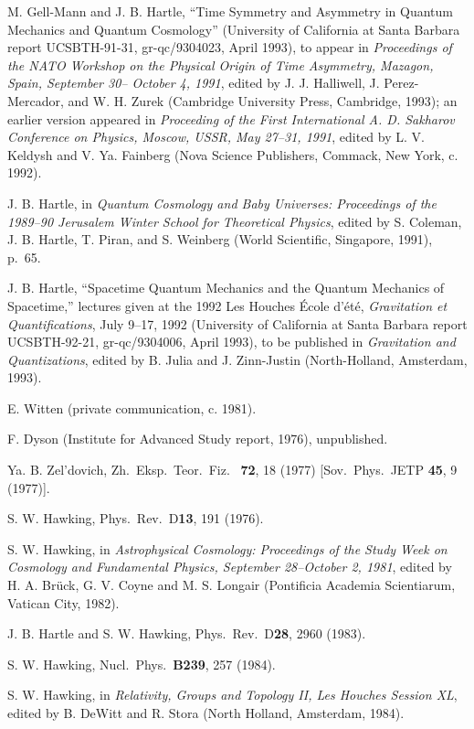 \documentclass[12pt]{article}
\begin{document}
\begin{thebibliography}{999}
 M. Gell-Mann and J. B. Hartle, ``Time Symmetry
and Asymmetry in Quantum Mechanics and Quantum
Cosmology'' (University of California at Santa Barbara
report UCSBTH-91-31, gr-qc/9304023, April 1993),
to appear in {\em
Proceedings of the NATO Workshop on the Physical Origin
of Time Asymmetry, Mazagon, Spain, September 30--
October 4, 1991}, edited by J. J. Halliwell, J. Perez-
Mercador, and W. H. Zurek (Cambridge University Press,
Cambridge, 1993); an earlier version appeared in
{\em Proceeding of the First
International A. D. Sakharov Conference on Physics,
Moscow, USSR, May 27--31, 1991}, edited by L. V. Keldysh
and V. Ya. Fainberg (Nova Science Publishers, Commack,
New York, c. 1992).

 J. B. Hartle, in {\em Quantum Cosmology and
Baby Universes:  Proceedings of the 1989--90 Jerusalem
Winter School for Theoretical Physics}, edited by S.
Coleman, J. B. Hartle, T. Piran, and S. Weinberg (World
Scientific, Singapore, 1991), p.~65.

 J. B. Hartle, ``Spacetime Quantum Mechanics
and the Quantum Mechanics of Spacetime,'' lectures given
at the 1992 Les Houches \'{E}cole d'\'{e}t\'{e}, {\em
Gravitation et Quantifications}, July 9--17, 1992
(University of California at Santa Barbara
report UCSBTH-92-21, gr-qc/9304006, April 1993),
to be published in {\em Gravitation and Quantizations},
edited by B. Julia and J. Zinn-Justin (North-Holland,
Amsterdam, 1993).

 E. Witten (private communication, c. 1981).

 F. Dyson (Institute for Advanced Study report, 1976),
unpublished.

 Ya. B. Zel'dovich, Zh.\ Eksp.\ Teor.\ Fiz.\ {\bf
72}, 18
(1977) [Sov.\ Phys.\ JETP {\bf 45}, 9 (1977)].

 S. W. Hawking,  Phys.\ Rev.\ D{\bf 13}, 191 (1976).

 S. W. Hawking, in {\em Astrophysical Cosmology:
Proceedings of the Study Week on Cosmology and
Fundamental Physics, September 28--October 2, 1981},
edited by H. A. Br\"uck, G. V. Coyne and M. S. Longair
(Pontificia Academia Scientiarum, Vatican City, 1982).

 J. B. Hartle and S. W. Hawking,
Phys.\ Rev.\ D{\bf 28}, 2960 (1983).

 S. W. Hawking, Nucl.\ Phys.\ {\bf B239},
257 (1984).

 S. W. Hawking, in {\em Relativity, Groups and
Topology II, Les Houches Session XL}, edited by B. DeWitt and
R. Stora (North Holland, Amsterdam, 1984).


\end{thebibliography}
\end{document}
